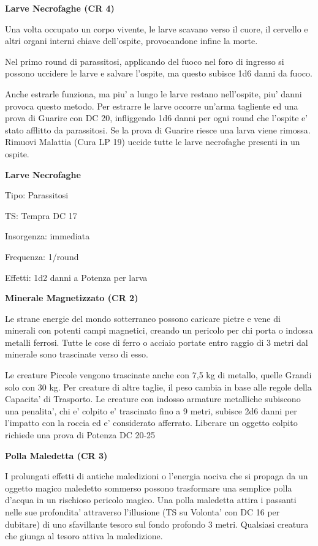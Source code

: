 \documentclass[a4paper,11pt,twoside,openany]{book}
\begin{document}
{\textbf{Larve Necrofaghe (CR 4)}

Una volta occupato un corpo vivente, le larve scavano verso il cuore, il cervello e altri organi interni chiave dell'ospite, provocandone infine la morte.

Nel primo round di parassitosi, applicando del fuoco nel foro di ingresso si possono uccidere le larve e salvare l'ospite, ma questo subisce 1d6 danni da fuoco. 

Anche estrarle funziona, ma piu' a lungo le larve restano nell'ospite, piu' danni provoca questo metodo. Per estrarre le larve occorre un'arma tagliente ed una prova di Guarire con DC 20, infliggendo 1d6 danni per ogni round che l'ospite e' stato afflitto da parassitosi. Se la prova di Guarire riesce una larva viene rimossa. Rimuovi Malattia (Cura LP 19) uccide tutte le larve necrofaghe presenti in un ospite.

\textbf{Larve Necrofaghe}

Tipo: Parassitosi

TS: Tempra DC 17

Insorgenza: immediata

Frequenza: 1/round

Effetti: 1d2 danni a Potenza per larva

\textbf{Minerale Magnetizzato (CR 2)}

Le strane energie del mondo sotterraneo possono caricare pietre e vene di minerali con potenti campi magnetici, creando un pericolo per chi porta o indossa metalli ferrosi. Tutte le cose di ferro o acciaio portate entro raggio di 3 metri dal minerale sono trascinate verso di esso.

Le creature Piccole vengono trascinate anche con 7,5 kg di metallo, quelle Grandi solo con 30 kg. Per creature di altre taglie, il peso cambia in base alle regole della Capacita' di Trasporto. Le creature con indosso armature metalliche subiscono una penalita', chi e' colpito e' trascinato fino a 9 metri, subisce 2d6 danni per l'impatto con la roccia ed e' considerato afferrato. Liberare un oggetto colpito richiede una prova di Potenza DC 20-25

\textbf{Polla Maledetta (CR 3)}

I prolungati effetti di antiche maledizioni o l'energia nociva che si propaga da un oggetto magico maledetto sommerso possono trasformare una semplice polla d'acqua in un rischioso pericolo magico. Una polla maledetta attira i passanti nelle sue profondita' attraverso l'illusione (TS su Volonta' con DC 16 per dubitare) di uno sfavillante tesoro sul fondo profondo 3 metri. Qualsiasi creatura che giunga al tesoro attiva la maledizione.

}
\end{document}
